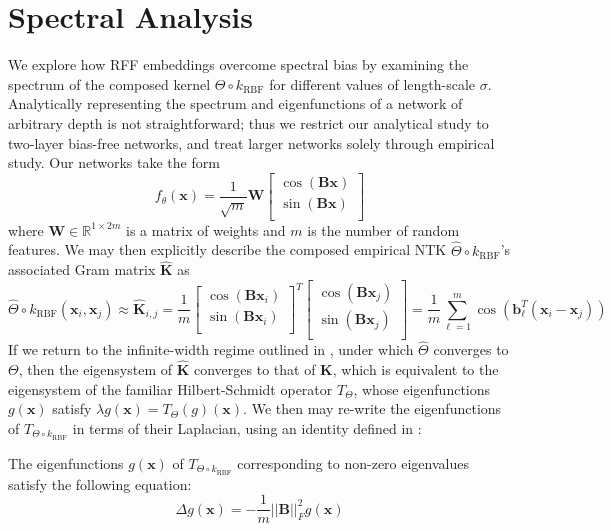 \documentclass[11pt]{article}
\newcommand{\R}{\mathbb{R}}
\begin{document}
\section{Spectral Analysis}
We explore how RFF embeddings overcome spectral bias by examining the spectrum of the composed kernel $\Theta \circ k_\text{RBF}$ for different values of length-scale $\sigma$. Analytically representing the spectrum and eigenfunctions of a network of arbitrary depth is not straightforward; thus we restrict our analytical study to two-layer bias-free networks, and treat larger networks solely through empirical study. Our networks take the form
$$f_\theta(\mathbf{x}) = \frac{1}{\sqrt{m}}\mathbf{W}\begin{bmatrix}
    \cos(\mathbf{Bx})\\
    \sin(\mathbf{Bx})\\
\end{bmatrix}$$
where $\mathbf{W} \in \R^{1 \times 2m}$ is a matrix of weights and $m$ is the number of random features. We may then explicitly describe the composed empirical NTK $\hat{\Theta} \circ k_\text{RBF}$'s associated Gram matrix $\hat{\mathbf{K}}$ as
$$\hat{\Theta} \circ k_\text{RBF}(\mathbf{x}_i, \mathbf{x}_j) \approx \hat{\mathbf{K}}_{i, j} = \frac1m \begin{bmatrix}
    \cos(\mathbf{Bx}_i)\\
    \sin(\mathbf{Bx}_i)\\
\end{bmatrix}^T\begin{bmatrix}
    \cos(\mathbf{Bx}_j)\\
    \sin(\mathbf{Bx}_j)\\
\end{bmatrix} = \frac1m \sum_{\ell = 1}^m \cos(\mathbf{b}_\ell^T(\mathbf{x}_i - \mathbf{x}_j))$$
If we return to the infinite-width regime outlined in \cite{Lee}, under which $\hat{\Theta}$ converges to $\Theta$, then the eigensystem of $\hat{\mathbf{K}}$ converges to that of $\mathbf{K}$, which is equivalent to the eigensystem of the familiar Hilbert-Schmidt operator $T_{\Theta}$, whose eigenfunctions $g(\mathbf{x})$ satisfy $\lambda g(\mathbf{x}) = T_{\Theta}(g)(\mathbf{x})$. We then may re-write the eigenfunctions of $T_{\Theta \circ k_\text{RBF}}$ in terms of their Laplacian, using an identity defined in \cite{PINN}:
\begin{lemma*} The eigenfunctions $g(\mathbf{x})$ of $T_{\Theta \circ k_\text{RBF}}$ corresponding to non-zero eigenvalues satisfy the following equation:
$$\Delta g(\mathbf{x}) = -\frac1m||\mathbf{B}||_F^2g(\mathbf{x})$$
\end{lemma*}
\end{document}
